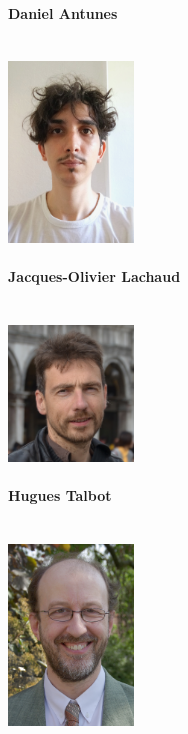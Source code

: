 \documentclass[11pt]{paper}
\begin{document}
\paragraph{Daniel Antunes}
~\\
\includegraphics[width=0.25\textwidth]{Daniel_Antunes.png}


\paragraph{Jacques-Olivier Lachaud}
~\\
\includegraphics[width=0.25\textwidth]{jol.png}

\paragraph{Hugues Talbot}
~\\
\includegraphics[width=0.25\textwidth]{Hugues_Talbot_small.png}
\end{document}
